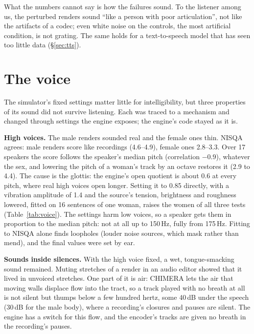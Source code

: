 \documentclass[10pt,a4paper,twocolumn]{article}
\begin{document}
What the numbers cannot say is how the failures sound. To the listener among us, the perturbed
renders sound ``like a person with poor articulation'', not like the artifacts of a codec; even
white noise on the controls, the most artificial condition, is not grating. The same holds for a
text-to-speech model that has seen too little data (\S\ref{sec:tts}).

\section{The voice}\label{sec:voice}
The simulator's fixed settings matter little for intelligibility, but three properties of its
sound did not survive listening. Each was traced to a mechanism and changed through settings the
engine exposes; the engine's code stayed as it is.

\textbf{High voices.} The male renders sounded real and the female ones thin. NISQA agrees: male
renders score like recordings (4.6--4.9), female ones 2.8--3.3. Over 17 speakers the score follows
the speaker's median pitch (correlation $-0.9$), whatever the sex, and lowering the pitch of a
woman's track by an octave restores it (2.9 to 4.4). The cause is the glottis: the engine's open
quotient is about 0.6 at every pitch, where real high voices open longer. Setting it to 0.85
directly, with a vibration amplitude of 1.4 and the source's tension, brightness and roughness
lowered, fitted on 16 sentences of one woman, raises the women of all three tests (Table~\ref{tab:voice}).
The settings harm low voices, so a speaker gets them in proportion to the median pitch: not at
all up to 150\,Hz, fully from 175\,Hz. Fitting to NISQA alone finds loopholes (louder noise
sources, which mask rather than mend), and the final values were set by ear.

\textbf{Sounds inside silences.} With the high voice fixed, a wet, tongue-smacking sound remained.
Muting stretches of a render in an audio editor showed that it lived in unvoiced stretches. One
part of it is air: CHIMERA lets the air that moving walls displace flow into the tract, so a
track played with no breath at all is not silent but thumps below a few hundred hertz, some
40\,dB under the speech (30\,dB for the male body), where a recording's closures and pauses are
silent. The engine has a switch for this flow, and the encoder's tracks are given no breath in
the recording's pauses.
\end{document}
